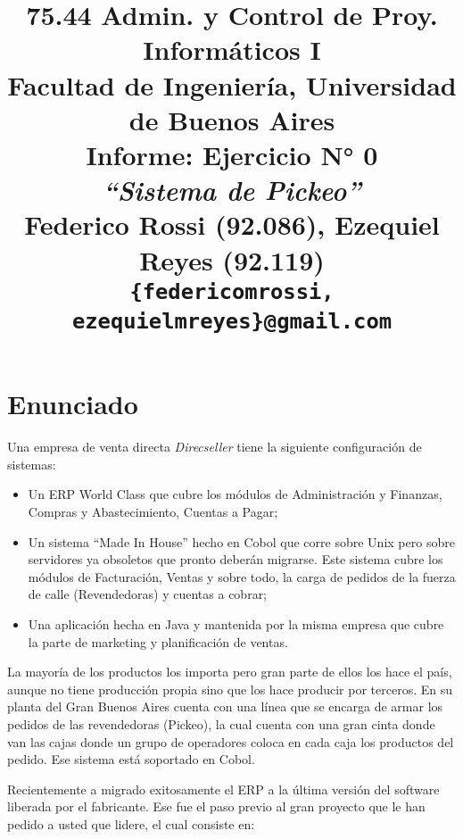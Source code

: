\documentclass{article}
\begin{document}
\title{
	  \Large 75.44 Admin. y Control de Proy. Informáticos I \\ 
	  \medskip\large Facultad de Ingeniería, Universidad de Buenos Aires \\
	  \bigskip\Huge Informe: Ejercicio N° 0  \\
	  \medskip\huge\textit{``Sistema de Pickeo''} \\
	  \bigskip\bigskip\large\textbf{Federico Rossi (92.086), Ezequiel Reyes (92.119)} \\
	  \medskip\normalsize\texttt{\{federicomrossi, ezequielmreyes\}@gmail.com} \\
}
\date{}
\maketitle




%
%
\section{Enunciado}
	
	Una empresa de venta directa \textit{Direcseller} tiene la siguiente configuración de sistemas:

	\begin{itemize}
		\itemsep=3pt \topsep=0pt \partopsep=0pt \parskip=0pt \parsep=0pt

		\item Un ERP World Class que cubre los módulos de Administración y Finanzas, Compras y Abastecimiento, Cuentas a Pagar;

		\item Un sistema ``Made In House'' hecho en Cobol que corre sobre Unix pero sobre servidores ya obsoletos que pronto deberán migrarse. Este sistema cubre los módulos de Facturación, Ventas y sobre todo, la carga de pedidos de la fuerza de calle (Revendedoras) y cuentas a cobrar;

		\item Una aplicación hecha en Java y mantenida por la misma empresa que cubre la parte de marketing y planificación de ventas.

	\end{itemize}
	\medskip

	La mayoría de los productos los importa pero gran parte de ellos los hace el país, aunque no tiene producción propia sino que los hace producir por terceros. En su planta del Gran Buenos Aires cuenta con una línea que se encarga de armar los pedidos de las revendedoras (Pickeo), la cual cuenta con una gran cinta donde van las cajas donde un grupo de operadores coloca en cada caja los productos del pedido. Ese sistema está soportado en Cobol.
	\par
	Recientemente a migrado exitosamente el ERP a la última versión del software liberada por el fabricante. Ese fue el paso previo al gran proyecto que le han pedido a usted que lidere, el cual consiste en:
\end{document}
